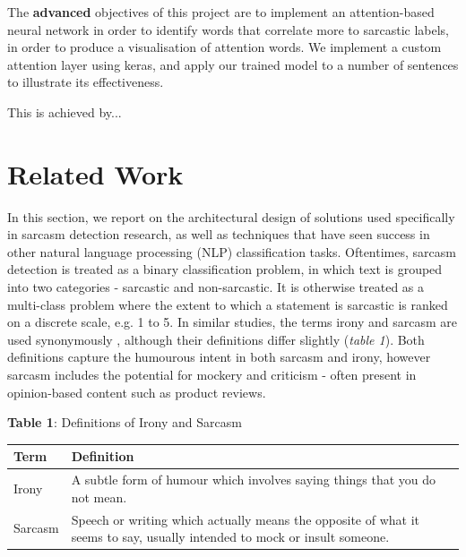 \documentclass[12pt,a4paper]{article}
\begin{document}
The \textbf{advanced} objectives of this project are to implement an attention-based neural network in order to identify words that correlate more to sarcastic labels, in order to produce a visualisation of attention words. We implement a custom attention layer using keras, and apply our trained model to a number of sentences to illustrate its effectiveness.

This is achieved by...




\newpage
\section{Related Work}
\noindent In this section, we report on the architectural design of solutions used specifically in sarcasm detection research, as well as techniques that have seen success in other natural language processing (NLP) classification tasks. Oftentimes, sarcasm detection is treated as a binary classification problem, in which text is grouped into two categories - sarcastic and non-sarcastic. It is otherwise treated as a multi-class problem where the extent to which a statement is sarcastic is ranked on a discrete scale, e.g. 1 to 5. In similar studies, the terms irony and sarcasm are used synonymously \cite{tsur2010icwsm}, although their definitions differ slightly (\textit{table 1}). Both definitions capture the humourous intent in both sarcasm and irony, however sarcasm includes the potential for mockery and criticism - often present in opinion-based content such as product reviews.\vspace{-2pt}

\begin{center}
	\textbf{Table 1}: Definitions of Irony and Sarcasm\vspace{-5pt}
\end{center}
\begin{center}
	\begin{tabular}{p{1.5cm}p{13.2cm}}
		\hline
		\textbf{Term} & \textbf{Definition}\\
		\hline\hline
		Irony & A subtle form of humour which involves saying things that you do not mean. \footnotemark[1]\\
		\hline
		Sarcasm & Speech or writing which actually means the opposite of what it seems to say, usually intended to mock or insult someone. \footnotemark[2]\\
		\hline
	\end{tabular}\\
\end{center}\vspace{-10pt}
\end{document}
